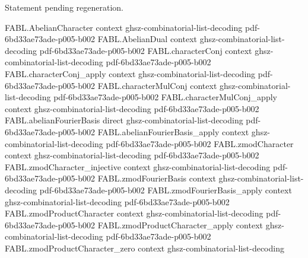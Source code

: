 \begin{theorem}
\label{FABL.character_eq_zero_or_expect_eq_zero}
\leanok
{}
Statement pending regeneration.
\end{theorem}

\begin{theorem}
\label{FABL.expect_character_eq_ite}
\leanok
{}
\proofstep
  {FABL.AbelianCharacter}
  {context}
  {ghsz-combinatorial-list-decoding}
  {pdf-6bd33ae73ade-p005-b002}
\proofstep
  {FABL.AbelianDual}
  {context}
  {ghsz-combinatorial-list-decoding}
  {pdf-6bd33ae73ade-p005-b002}
\proofstep
  {FABL.characterConj}
  {context}
  {ghsz-combinatorial-list-decoding}
  {pdf-6bd33ae73ade-p005-b002}
\proofstep
  {FABL.characterConj_apply}
  {context}
  {ghsz-combinatorial-list-decoding}
  {pdf-6bd33ae73ade-p005-b002}
\proofstep
  {FABL.characterMulConj}
  {context}
  {ghsz-combinatorial-list-decoding}
  {pdf-6bd33ae73ade-p005-b002}
\proofstep
  {FABL.characterMulConj_apply}
  {context}
  {ghsz-combinatorial-list-decoding}
  {pdf-6bd33ae73ade-p005-b002}
\proofstep
  {FABL.abelianFourierBasis}
  {direct}
  {ghsz-combinatorial-list-decoding}
  {pdf-6bd33ae73ade-p005-b002}
\proofstep
  {FABL.abelianFourierBasis_apply}
  {context}
  {ghsz-combinatorial-list-decoding}
  {pdf-6bd33ae73ade-p005-b002}
\proofstep
  {FABL.zmodCharacter}
  {context}
  {ghsz-combinatorial-list-decoding}
  {pdf-6bd33ae73ade-p005-b002}
\proofstep
  {FABL.zmodCharacter_injective}
  {context}
  {ghsz-combinatorial-list-decoding}
  {pdf-6bd33ae73ade-p005-b002}
\proofstep
  {FABL.zmodFourierBasis}
  {context}
  {ghsz-combinatorial-list-decoding}
  {pdf-6bd33ae73ade-p005-b002}
\proofstep
  {FABL.zmodFourierBasis_apply}
  {context}
  {ghsz-combinatorial-list-decoding}
  {pdf-6bd33ae73ade-p005-b002}
\proofstep
  {FABL.zmodProductCharacter}
  {context}
  {ghsz-combinatorial-list-decoding}
  {pdf-6bd33ae73ade-p005-b002}
\proofstep
  {FABL.zmodProductCharacter_apply}
  {context}
  {ghsz-combinatorial-list-decoding}
  {pdf-6bd33ae73ade-p005-b002}
\proofstep
  {FABL.zmodProductCharacter_zero}
  {context}
  {ghsz-combinatorial-list-decoding}

\end{theorem}

